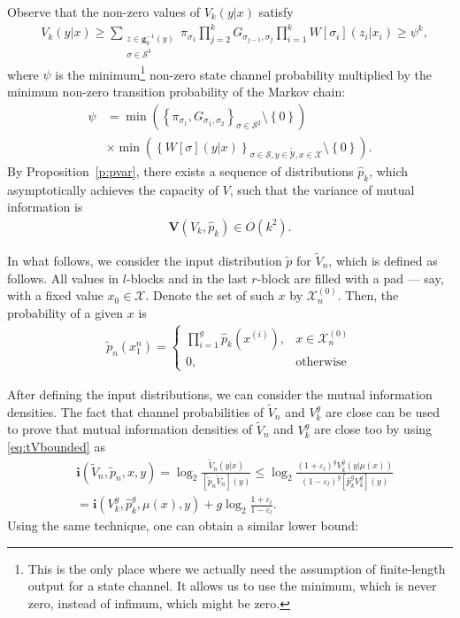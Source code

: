 \documentclass[journal, twocol]{IEEEtran}
\newcommand{\tp}{{\widetilde{p}}}
\newcommand{\hp}{{\hat{p}}}
\newcommand{\mS}{{\mathcal{S}}}
\newcommand{\bfV}{{\mathbf{V}}}
\newcommand{\tV}{{\widetilde{V}}}
\newcommand{\mX}{{\mathcal{X}}}
\newcommand{\mY}{{\mathcal{Y}}}
\newcommand{\tmY}{{\widetilde{\mY}}}
\newcommand{\set}[1]{{\left\{{#1}\right\}}}
\newcommand{\br}[1]{{\left({#1}\right)}}
\newcommand{\ve}{\varepsilon}
\newcommand{\bg}{\mathbf{g}}
\newcommand{\bi}{\mathbf{i}}
\newcommand{\pWyd}[2]{[{#1}{#2}]}
\begin{document}
Observe that the non-zero values of $V_k(y|x)$ satisfy
\begin{align}
&V_k(y|x)\geq \sum_{\substack{z\in\bg^{-1}_k(y)\\\sigma\in\mS^k}} \pi_{\sigma_1}\prod_{j=2}^k G_{\sigma_{j-1},\sigma_j} \prod_{i=1}^k W[\sigma_i](z_i|x_i)
\geq \psi^k,
\end{align}
where $\psi$ is the minimum\footnote{This is the only place where we actually need the assumption of finite-length output for a state channel. It allows us to use the minimum, which is never zero, instead of infimum, which might be zero.} non-zero state channel probability multiplied by the minimum non-zero transition probability of the Markov chain:
\begin{align}
\psi&=\min\br{\set{\pi_{\sigma_1},G_{\sigma_1,\sigma_2}}_{\sigma \in \mS^2}\setminus \set{0}}
\nonumber\\&
\times
\min\br{\set{W[\sigma](y|x)}_{\sigma\in\mS,y\in\tmY,x\in\mX}\setminus\set{0}}.
\end{align}
By Proposition~\ref{p:pvar}, there exists a sequence of distributions $\hp_k$, which asymptotically achieves the capacity of $V$, such that the variance of mutual information is
\begin{align}
\bfV(V_k,\hp_k) \in O(k^2).
\label{eq:varhat}
\end{align}

In what follows, we consider the input distribution $\tp$ for $\tV_n$, which is defined as follows.
All values in $l$-blocks and in the last $r$-block are filled with a pad --- say, with a fixed value $x_0\in\mX$.
Denote the set of such $x$ by $\mX^{(0)}_n$.
Then, the probability of a given $x$ is
\begin{align}
\tp_n(x_1^n)=
\begin{cases}
\prod_{i=1}^g \hp_k(x^{(i)}), & x\in\mX^{(0)}_n \\
0, & \text{otherwise}
\end{cases}
\label{eq:tp}
\end{align}

After defining the input distributions, we can consider the mutual information densities.
The fact that channel probabilities of $\tV_n$ and $V^g_k$ are close can be used to prove that mutual information densities of $\tV_n$ and $V^g_k$ are close too by using \eqref{eq:tVbounded} as
\begin{align}
&\bi(\tV_n,\tp_n,x,y)
=\log_2\frac{\tV_n(y|x)}{\pWyd{\tp_n}{\tV_n}(y)} 
\leq \log_2 \!\frac{(1+\ve_l)^g V^g_{k}(y|\mu(x))}{(1-\ve_l)^g \pWyd{\hp_k^g}{V^g_k}(y)}
\nonumber\\&
=
\bi(V^g_k,\hp_k^g,\mu(x),y)+g\log_2 \frac{1+\ve_l}{1-\ve_l}.
\label{eq:etvnvmq}
\end{align}
Using the same technique, one can obtain a similar lower bound:
\end{document}

